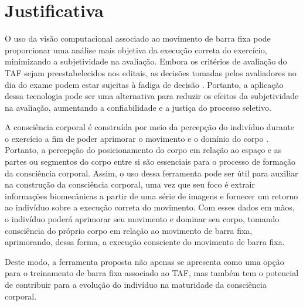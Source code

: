 \section{Justificativa}

O uso da visão computacional associado ao movimento de barra fixa pode proporcionar uma análise mais objetiva da execução correta do exercício, minimizando a subjetividade na avaliação. Embora os critérios de avaliação do \ac{TAF} sejam preestabelecidos nos editais, as decisões tomadas pelos avaliadores no dia do exame podem estar sujeitas à fadiga de decisão \cite{fadiga}. Portanto, a aplicação dessa tecnologia pode ser uma alternativa para reduzir os efeitos da subjetividade na avaliação, aumentando a confiabilidade e a justiça do processo seletivo.

A consciência corporal é construída por meio da percepção do indivíduo durante o exercício a fim de poder aprimorar o movimento e o domínio do corpo \cite{consciencia}. Portanto, a percepção do posicionamento do corpo em relação ao espaço e as partes ou segmentos do corpo entre si são essenciais para o processo de formação da consciência corporal. Assim, o uso dessa ferramenta pode ser útil para auxiliar na construção da consciência corporal, uma vez que seu foco é extrair informações biomecânicas a partir de uma série de imagens e fornecer um retorno ao indivíduo sobre a execução correta do movimento. Com esses dados em mãos, o indivíduo poderá aprimorar seu movimento e dominar seu corpo, tomando consciência do próprio corpo em relação ao movimento de barra fixa, aprimorando, dessa forma, a execução consciente do movimento de barra fixa.

Deste modo, a ferramenta proposta não apenas se apresenta como uma opção para o treinamento de barra fixa associado ao \ac{TAF}, mas também tem o potencial de contribuir para a evolução do indivíduo na maturidade da consciência corporal.
